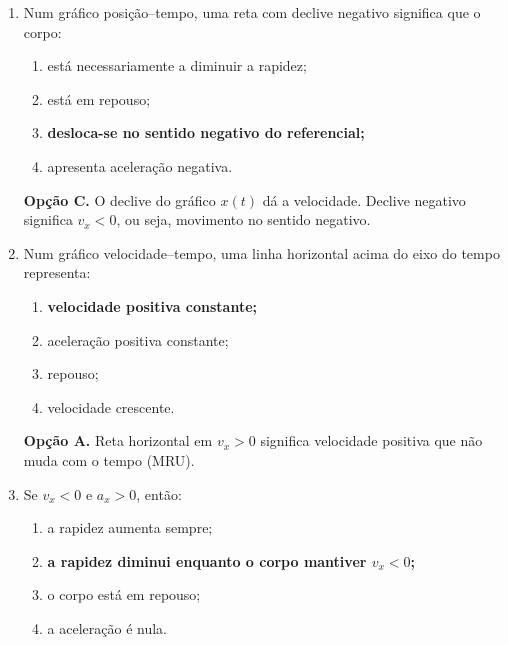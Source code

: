\documentclass[11pt,a4paper]{article}
\begin{document}
	\begin{enumerate}[label=\textbf{\arabic*.},resume]
		
		\item Num gráfico posição--tempo, uma reta com declive negativo significa que
		o corpo:
		
		\begin{enumerate}[label=\Alph*.]
			\item está necessariamente a diminuir a rapidez;
			\item está em repouso;
			\item \textbf{desloca-se no sentido negativo do referencial;}
			\item apresenta aceleração negativa.
		\end{enumerate}
		
		\begin{solucao}
			\textbf{Opção C.} O declive do gráfico $x(t)$ dá a velocidade. Declive negativo significa $v_x < 0$, ou seja, movimento no sentido negativo.
		\end{solucao}
		
		\item Num gráfico velocidade--tempo, uma linha horizontal acima do eixo do
		tempo representa:
		
		\begin{enumerate}[label=\Alph*.]
			\item \textbf{velocidade positiva constante;}
			\item aceleração positiva constante;
			\item repouso;
			\item velocidade crescente.
		\end{enumerate}
		
		\begin{solucao}
			\textbf{Opção A.} Reta horizontal em $v_x > 0$ significa velocidade positiva que não muda com o tempo (MRU).
		\end{solucao}
		
		\item Se $v_x<0$ e $a_x>0$, então:
		
		\begin{enumerate}[label=\Alph*.]
			\item a rapidez aumenta sempre;
			\item \textbf{a rapidez diminui enquanto o corpo mantiver $v_x<0$;}
			\item o corpo está em repouso;
			\item a aceleração é nula.
		\end{enumerate}
		

\end{enumerate}
\end{document}
